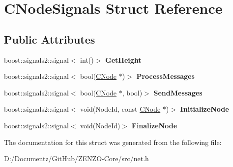 \hypertarget{struct_c_node_signals}{}\section{C\+Node\+Signals Struct Reference}
\label{struct_c_node_signals}
\subsection*{Public Attributes}
\begin{DoxyCompactItemize}
\item 
\mbox{\label{struct_c_node_signals_ae84a1d4c612bce8f90c8008814afb14e}} 
boost\+::signals2\+::signal$<$ int()$>$ {\bfseries Get\+Height}
\item 
\mbox{\label{struct_c_node_signals_a18d1206d9966a7288c05f83484e1a7a9}} 
boost\+::signals2\+::signal$<$ bool(\mbox{\hyperlink{class_c_node}{C\+Node}} $\ast$)$>$ {\bfseries Process\+Messages}
\item 
\mbox{\label{struct_c_node_signals_a526a182786f3addec6836320dbfbcd9f}} 
boost\+::signals2\+::signal$<$ bool(\mbox{\hyperlink{class_c_node}{C\+Node}} $\ast$, bool)$>$ {\bfseries Send\+Messages}
\item 
\mbox{\label{struct_c_node_signals_a907f7fb3803fd63daca5209c4d7b6a2f}} 
boost\+::signals2\+::signal$<$ void(Node\+Id, const \mbox{\hyperlink{class_c_node}{C\+Node}} $\ast$)$>$ {\bfseries Initialize\+Node}
\item 
\mbox{\label{struct_c_node_signals_af6a795395999180eb97a57e89456059e}} 
boost\+::signals2\+::signal$<$ void(Node\+Id)$>$ {\bfseries Finalize\+Node}
\end{DoxyCompactItemize}


The documentation for this struct was generated from the following file\+:\begin{DoxyCompactItemize}
\item 
D\+:/\+Documentz/\+Git\+Hub/\+Z\+E\+N\+Z\+O-\/\+Core/src/net.\+h\end{DoxyCompactItemize}
